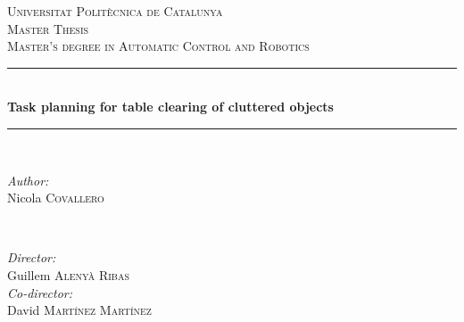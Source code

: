 \begin{titlepage}

\vspace*{\fill}

\newcommand{\HRule}{\rule{\linewidth}{0.5mm}} %

\center %
 

\textsc{\LARGE Universitat Polit\`ecnica de Catalunya}\\[1.5cm] %
\textsc{\Large Master Thesis}\\[0.5cm] %
\textsc{\large Master's degree in Automatic Control and Robotics}\\[0.5cm] %


\HRule \\[0.4cm]
{ \huge \bfseries Task planning for table clearing of cluttered objects}\\[0.4cm] %
\HRule \\[1.5cm]
 

\begin{minipage}{0.4\textwidth}
\begin{flushleft} \large
\emph{Author:}\\
Nicola \textsc{Covallero} %
\end{flushleft}
\end{minipage}
~
\begin{minipage}{0.4\textwidth}
\begin{flushright} \large
\emph{Director:} \\
Guillem \textsc{Aleny\`a Ribas} \\
\emph{Co-director:}\\
David \textsc{Martínez Martínez} \\
\end{flushright}
\end{minipage}\\[1cm]


\end{titlepage}
